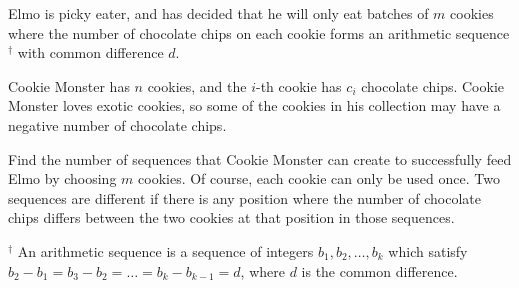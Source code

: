 Elmo is picky eater, and has decided that he will only eat batches of $m$ cookies where the number of chocolate chips on each cookie forms an arithmetic sequence$^\dagger$ with common difference $d$. 

Cookie Monster has $n$ cookies, and the $i$-th cookie has $c_i$ chocolate chips. Cookie Monster loves exotic cookies, so some of the cookies in his collection may have a negative number of chocolate chips. 

Find the number of sequences that Cookie Monster can create to successfully feed Elmo by choosing $m$ cookies. Of course, each cookie can only be used once. Two sequences are different if there is any position where the number of chocolate chips differs between the two cookies at that position in those sequences. 

$^\dagger$ An arithmetic sequence is a sequence of integers $b_1, b_2, \dots, b_k$ which satisfy $b_2 - b_1 = b_3 - b_2 = \ldots = b_k - b_{k-1} = d$, where $d$ is the common difference.

